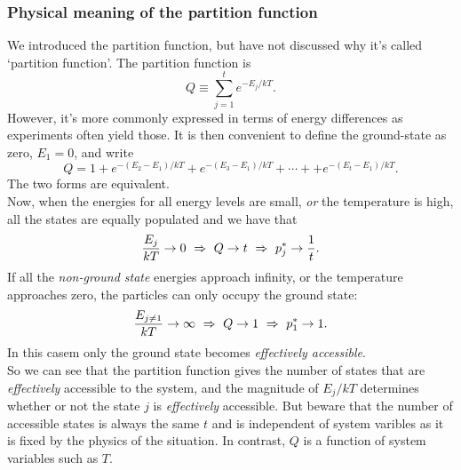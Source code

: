 \subsubsection{Physical meaning of the partition function}
We introduced the partition function, but have not discussed why it's called `partition function'. 
The partition function is 
\begin{equation}
Q\equiv \sum^{t}_{j=1} e^{-E_j/kT}.
\end{equation}
However, it's more commonly expressed in terms of energy differences as experiments often yield those. 
It is then convenient to define the ground-state as zero, $E_1=0$, and write
\begin{equation}
Q=1+e^{-(E_2-E_1)/kT}+e^{-(E_3-E_1)/kT}+\cdots++e^{-(E_t-E_1)/kT}.
\end{equation}
The two forms are equivalent. \\
Now, when the energies for all energy levels are small, \textit{or} the temperature is high, all the states are equally populated and we have that 
\begin{equation}
\frac{E_j}{kT}\rightarrow0\ \imp\ Q\rightarrow t\ \imp\ p_j^*\rightarrow\frac{1}{t}.
\end{equation}
If all the \textit{non-ground state} energies approach infinity, or the temperature approaches zero, the particles can only occupy the ground state:
\begin{equation}
\frac{E_{j\neq1}}{kT}\rightarrow \inf\ \imp\ Q\rightarrow1\ \imp\ p_1^*\rightarrow1.
\end{equation}
In this casem only the ground state becomes \textit{effectively accessible}. \\
So we can see that the partition function gives the number of states that are \emph{effectively} accessible to the system, 
and the magnitude of $E_j/kT$ determines whether or not the state $j$ is \textit{effectively} accessible. 
But beware that the number of accessible states is always the same $t$ and is independent of system varibles as it is fixed by the physics of the situation. 
In contrast, $Q$ is a function of system variables such as $T$. 

